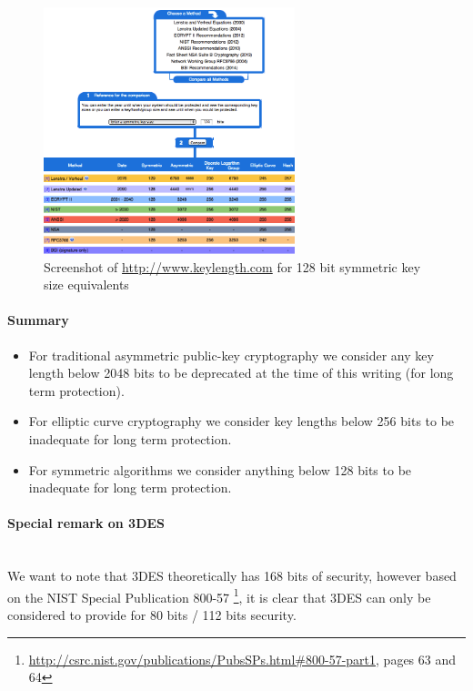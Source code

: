 \begin{figure}[h]
  \centering
  \includegraphics[width=0.65\textwidth]{img/keylengths_com.png}
  \caption{Screenshot of \url{http://www.keylength.com} for 128 bit symmetric key size equivalents}
  \label{fig:keylengths.com}
\end{figure}


\paragraph{Summary}
\begin{itemize}

\item For traditional asymmetric public-key cryptography we consider any key
length below 2048 bits to be deprecated at the time of this writing (for long
term protection).  

\item For elliptic curve cryptography we consider key lengths below 256 bits to
be inadequate for long term protection.  

\item For symmetric algorithms we consider anything below 128 bits to be
inadequate for long term protection.

\end{itemize}

\paragraph{Special remark on 3DES} \mbox{} \\
We want to note that 3DES theoretically has 168 bits of security, however based
on the NIST Special Publication 800-57
\footnote{\url{http://csrc.nist.gov/publications/PubsSPs.html\#800-57-part1},
pages 63 and 64}, it is clear that 3DES can only be considered to provide for
80 bits / 112 bits security.





